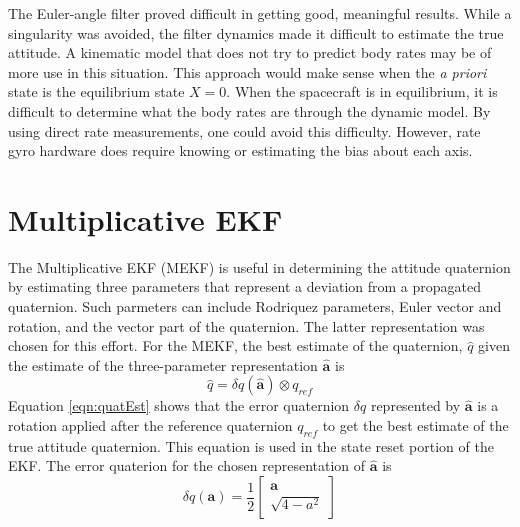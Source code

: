 \documentclass[]{aiaa-tc}%
\begin{document}
	\vspace{5 mm}

The Euler-angle filter proved difficult in getting good, meaningful results. While a singularity was avoided, the filter dynamics made it difficult to estimate the true attitude. A kinematic model that does not try to predict body rates may be of more use in this situation. This approach would make sense when the \textit{a priori} state is the equilibrium state $X=0$. When the spacecraft is in equilibrium, it is difficult to determine what the body rates are through the dynamic model. By using direct rate measurements, one could avoid this difficulty. However, rate gyro hardware does require knowing or estimating the bias about each axis. 

	\section{Multiplicative EKF}

The Multiplicative EKF (MEKF) is useful in determining the attitude quaternion by estimating three parameters that represent a deviation from a propagated quaternion. Such parmeters can include Rodriquez parameters, Euler vector and rotation, and the vector part of the quaternion. The latter representation was chosen for this effort.  For the MEKF, the best estimate of the quaternion, $\hat{q}$ given the estimate of the three-parameter representation $\hat{\mathbf{a}}$ is\cite{MarkleyAtt} 
\begin{equation}
\hat{q}=\delta q(\hat{\mathbf{a}})\otimes q_{ref}
\label{eqn:quatEst}
\end{equation}
Equation \ref{eqn:quatEst} shows that the error quaternion $\delta q$ represented by $\hat{\mathbf{a}}$ is a rotation applied after the reference quaternion $q_{ref}$ to get the best estimate of the true attitude quaternion. This equation is used in the state reset portion of the EKF. The error quaterion for the chosen representation of $\hat{\mathbf{a}}$ is 
\begin{equation}
\delta q(\mathbf{a}) = \frac{1}{2}\begin{bmatrix}
\mathbf{a}\\ 
\sqrt{4-a^2}
\end{bmatrix}
\label{eqn:quat_representation}
\end{equation}
\end{document}
